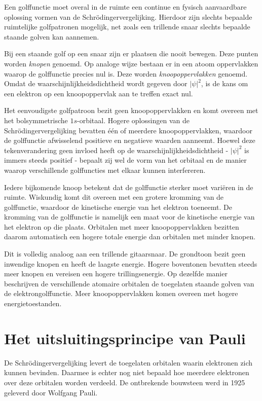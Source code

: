 Een golffunctie moet overal in de ruimte een continue en fysisch aanvaardbare oplossing vormen van de Schr\"odingervergelijking. Hierdoor zijn slechts bepaalde ruimtelijke golfpatronen mogelijk, net zoals een trillende snaar slechts bepaalde staande golven kan aannemen.

Bij een staande golf op een snaar zijn er plaatsen die nooit bewegen. Deze punten worden \emph{knopen} genoemd. Op analoge wijze bestaan er in een atoom oppervlakken waarop de golffunctie precies nul is. Deze worden \emph{knoopoppervlakken} genoemd. Omdat de waarschijnlijkheidsdichtheid wordt gegeven door $|\psi|^2$, is de kans om een elektron op een knoopoppervlak aan te treffen exact nul.

Het eenvoudigste golfpatroon bezit geen knoopoppervlakken en komt overeen met het bolsymmetrische $1s$-orbitaal. Hogere oplossingen van de Schr\"odingervergelijking bevatten één of meerdere knoopoppervlakken, waardoor de golffunctie afwisselend positieve en negatieve waarden aanneemt. Hoewel deze tekenverandering geen invloed heeft op de waarschijnlijkheidsdichtheid - $|\psi|^2$ is immers steeds positief - bepaalt zij wel de vorm van het orbitaal en de manier waarop verschillende golffuncties met elkaar kunnen interfereren.

Iedere bijkomende knoop betekent dat de golffunctie sterker moet variëren in de ruimte. Wiskundig komt dit overeen met een grotere kromming van de golffunctie, waardoor de kinetische energie van het elektron toeneemt. De kromming van de golffunctie is namelijk een maat voor de kinetische energie  van het elektron op die plaats. Orbitalen met meer knoopoppervlakken bezitten daarom automatisch een hogere totale energie dan orbitalen met minder knopen.

Dit is volledig analoog aan een trillende gitaarsnaar. De grondtoon bezit geen inwendige knopen en heeft de laagste energie. Hogere boventonen bevatten steeds meer knopen en vereisen een hogere trillingsenergie. Op dezelfde manier beschrijven de verschillende atomaire orbitalen de toegelaten staande golven van de elektrongolffunctie. Meer knoopoppervlakken komen overeen met hogere energietoestanden.

\section{Het uitsluitingsprincipe van Pauli}

De Schr\"odingervergelijking levert de toegelaten orbitalen waarin elektronen zich kunnen bevinden. Daarmee is echter nog niet bepaald hoe meerdere elektronen over deze orbitalen worden verdeeld. De ontbrekende bouwsteen werd in 1925 geleverd door Wolfgang Pauli.

